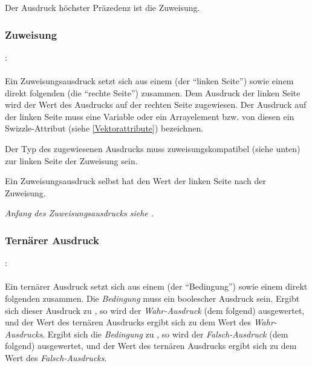 \documentclass[twoside,a4paper,fleqn,12pt]{book}
\begin{document}
Der Ausdruck höchster Präzedenz ist die Zuweisung.


\subsubsection{Zuweisung}
:\label{asdr_suffix_zuweisung}\\
\hspace*{1cm}\Gt{=}\Gspace{} \\

Ein Zuweisungsausdruck setzt sich aus einem  (der "`linken Seite"') sowie einem
direkt folgenden  (die "`rechte Seite"') zusammen.
Dem Ausdruck der linken Seite wird der Wert des Ausdrucks
auf der rechten Seite zugewiesen. Der Ausdruck auf der linken Seite muss eine Variable oder ein Arrayelement
bzw. von diesen ein Swizzle-Attribut (siehe \ref{Vektorattribute}) bezeichnen.

Der Typ des zugewiesenen Ausdrucks muss zuweisungskompatibel (siehe unten) zur linken Seite der Zuweisung sein.

Ein Zuweisungsausdruck selbst hat den Wert der linken Seite nach der Zuweisung.

\emph{Anfang des Zuweisungsausdrucks siehe .}

\subsubsection{Ternärer Ausdruck}\label{Ternaerer Ausdruck}
:\label{asdr_suffix_ternaer}\\
\hspace*{1cm}\Gspace{} \Gspace\Gt{:}\Gspace{} \\

Ein ternärer Ausdruck setzt sich aus einem  (der "`Bedingung"') sowie einem
direkt folgenden  zusammen.
Die \emph{Bedingung} muss ein boolescher Ausdruck sein. Ergibt sich dieser Ausdruck zu ,
so wird der \emph{Wahr-Ausdruck} (dem  folgend) ausgewertet, und der Wert des ternären
Ausdrucks ergibt sich zu dem Wert des \emph{Wahr-Ausdrucks}.
Ergibt sich die \emph{Bedingung} zu , so wird der \emph{Falsch-Ausdruck} (dem \kw{:} folgend)
ausgewertet, und der Wert des ternären
Ausdrucks ergibt sich zu dem Wert des \emph{Falsch-Ausdrucks}.
\end{document}
